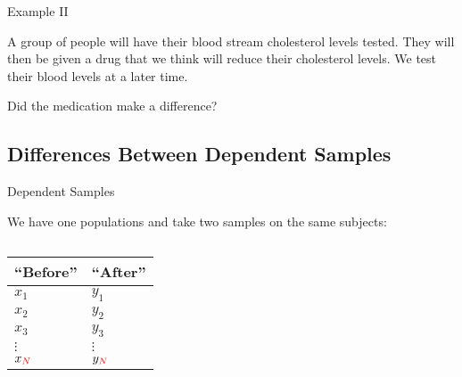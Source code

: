 \begin{frame}{Example II}

  A group of people will have their blood stream cholesterol levels
  tested. They will then be given a drug that we think will reduce
  their cholesterol levels. We test their blood levels at a later
  time.

  \vfill

  Did the medication make a difference?

  \vfill

  
\end{frame}


\subsection{Differences Between Dependent Samples}


\begin{frame}{Dependent Samples}

  We have one populations and take two samples on the same subjects: \\
  \begin{columns}
    \begin{tabular}{ll}
      ``Before'' & ``After'' \\ \hline
      $x_1$  & $y_1$ \\
      $x_2$  & $y_2$ \\
      $x_3$  & $y_3$ \\
      $\vdots$ & $\vdots$ \\
      $x_{{\color{red}N}}$ & $y_{{\color{red}N}}$  \\
    \end{tabular}
  \end{columns}


\end{frame}

